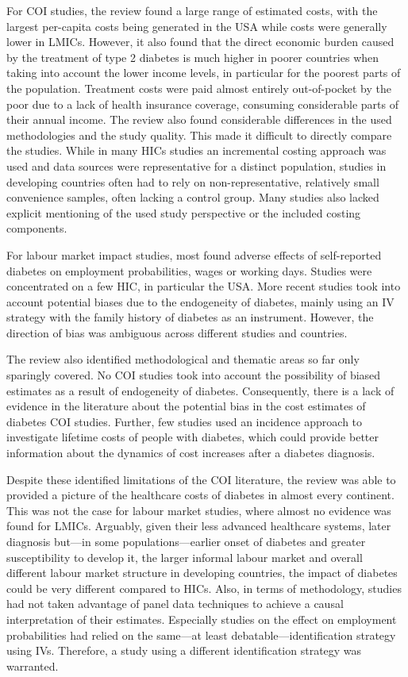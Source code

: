 For \ac{COI} studies, the review found a large range of estimated costs, with the largest per-capita costs being generated in the USA while costs were generally lower in \acp{LMIC}. However, it also found that the direct economic burden caused by the treatment of type 2 diabetes is much higher in poorer countries when taking into account the lower income levels, in particular for the poorest parts of the population. Treatment costs were paid almost entirely out-of-pocket by the poor due to a lack of health insurance coverage, consuming considerable parts of their annual income.  The review also found considerable differences in the used methodologies and the study quality. This made it difficult to directly compare the studies. While in many \acp{HIC} studies an incremental costing approach was used and data sources were representative for a distinct population, studies in developing countries often had to rely on non-representative, relatively small convenience samples, often lacking a control group. Many studies also lacked explicit mentioning of the used study perspective or the included costing components. 

For labour market impact studies, most found adverse effects of self-reported diabetes on employment probabilities, wages or working days. Studies were concentrated on a few \ac{HIC}, in particular the USA. More recent studies took into account potential biases due to the endogeneity of diabetes, mainly using an \ac{IV} strategy with the family history of diabetes as an instrument. However, the direction of bias was ambiguous across different studies and countries. 

The review also identified methodological and thematic areas so far only sparingly covered. No \ac{COI} studies took into account the possibility of biased estimates as a result of endogeneity of diabetes. Consequently, there is a lack of evidence in the literature about the potential bias in the cost estimates of diabetes \ac{COI} studies. Further, few studies used an incidence approach to investigate lifetime costs of people with diabetes, which could provide better information about the dynamics of cost increases after a diabetes diagnosis. 

Despite these identified limitations of the \ac{COI} literature, the review was able to provided a picture of the healthcare costs of diabetes in almost every continent. This was not the case for labour market studies, where almost no evidence was found for \acp{LMIC}. Arguably, given their less advanced healthcare systems, later diagnosis but---in some populations---earlier onset of diabetes and greater susceptibility to develop it, the larger informal labour market and overall different labour market structure in developing countries, the impact of diabetes could be very different compared to \acp{HIC}. Also, in terms of methodology, studies had not taken advantage of panel data techniques to achieve a causal interpretation of their estimates. Especially studies on the effect on employment probabilities had relied on the same---at least debatable---identification strategy using \acp{IV}. Therefore, a study using a different identification strategy was warranted.

